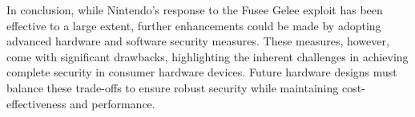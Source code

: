 In conclusion, while Nintendo's response to the Fusee Gelee exploit has been effective to a large extent, further enhancements could be made by adopting advanced hardware and software security measures. These measures, however, come with significant drawbacks, highlighting the inherent challenges in achieving complete security in consumer hardware devices. Future hardware designs must balance these trade-offs to ensure robust security while maintaining cost-effectiveness and performance.